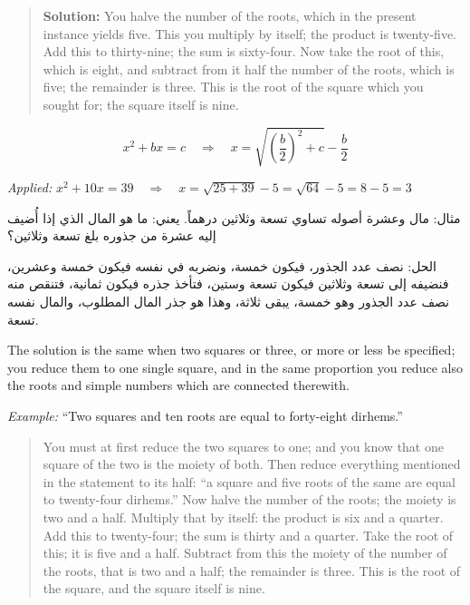 \documentclass[11pt,a4paper]{book}
\begin{document}
\begin{quote}
\textbf{Solution:} You halve the number of the roots, which in the present
instance yields five. This you multiply by itself; the product is twenty-five.
Add this to thirty-nine; the sum is sixty-four. Now take the root of this,
which is eight, and subtract from it half the number of the roots, which is
five; the remainder is three. This is the root of the square which you sought
for; the square itself is nine.
\end{quote}

\begin{mathbox}[title={\textbf{The Algorithm for Case IV}}]
\begin{equation}
x^2 + bx = c \quad\Longrightarrow\quad x = \sqrt{\left(\frac{b}{2}\right)^2 + c} - \frac{b}{2}
\end{equation}

\textit{Applied:} $x^2 + 10x = 39 \quad\Rightarrow\quad x = \sqrt{25 + 39} - 5 = \sqrt{64} - 5 = 8 - 5 = 3$
\end{mathbox}

\begin{arabicbox}
\begin{Arabic}
مثال: مال وعشرة أصوله تساوي تسعة وثلاثين درهماً. يعني: ما هو
المال الذي إذا أُضيف إليه عشرة من جذوره بلغ تسعة وثلاثين؟

الحل: نصف عدد الجذور، فيكون خمسة، ونضربه في نفسه فيكون
خمسة وعشرين، فنضيفه إلى تسعة وثلاثين فيكون تسعة وستين،
فتأخذ جذره فيكون ثمانية، فتنقص منه نصف عدد الجذور وهو خمسة،
يبقى ثلاثة، وهذا هو جذر المال المطلوب، والمال نفسه تسعة.
\end{Arabic}
\end{arabicbox}

The solution is the same when two squares or three, or more or less be
specified; you reduce them to one single square, and in the same proportion
you reduce also the roots and simple numbers which are connected therewith.

\textit{Example:} ``Two squares and ten roots are equal to forty-eight
  dirhems.''

\begin{quote}
You must at first reduce the two squares to one; and you know that one square
of the two is the moiety of both. Then reduce everything mentioned in the
statement to its half: ``a square and five roots of the same are equal to
twenty-four dirhems.'' Now halve the number of the roots; the moiety is two
and a half. Multiply that by itself: the product is six and a quarter. Add
this to twenty-four; the sum is thirty and a quarter. Take the root of this;
it is five and a half. Subtract from this the moiety of the number of the
roots, that is two and a half; the remainder is three. This is the root of
the square, and the square itself is nine.
\end{quote}
\end{document}
